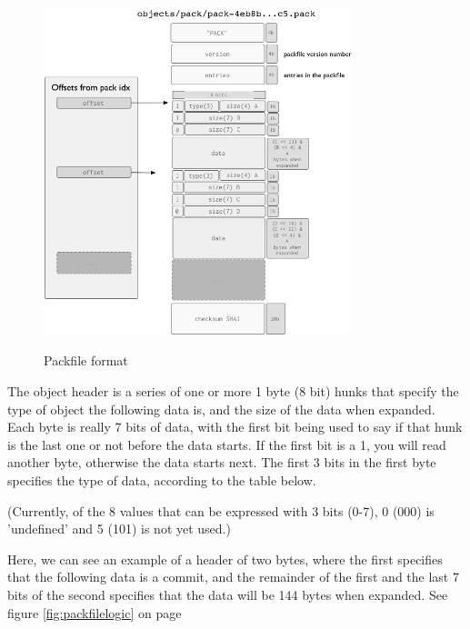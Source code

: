 \begin{figure}[tbp]
\centering
\includegraphics[width=0.80\textwidth]{content/git/packfile-format.png}
\label{fig:packfileformat}
\caption{Packfile format}
\end{figure}

The object header is a series of one or more 1 byte (8 bit) hunks that specify
the type of object the following data is, and the size of the data when
expanded. Each byte is really 7 bits of data, with the first bit being used to
say if that hunk is the last one or not before the data starts. If the first
bit is a 1, you will read another byte, otherwise the data starts next. The
first 3 bits in the first byte specifies the type of data, according to the
table below.

(Currently, of the 8 values that can be expressed with 3 bits (0-7), 0 (000) is
'undefined' and 5 (101) is not yet used.)

Here, we can see an example of a header of two bytes, where the first specifies
that the following data is a commit, and the remainder of the first and the
last 7 bits of the second specifies that the data will be 144 bytes when
expanded. See figure \ref{fig:packfilelogic} on page \pageref{fig:packfilelogic}

